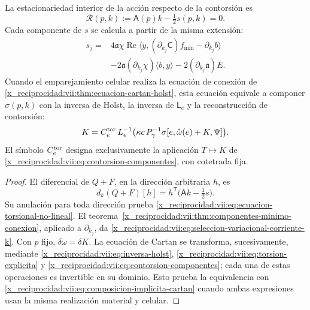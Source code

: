 \begin{proposition}
\label{x_reciprocidad:vii:prop:ecuacion-torsional-no-lineal}
La estacionariedad interior de la acción respecto de la contorsión es
\begin{equation}
 \mathcal R(p,k):=\mathsf A(p)k-\tfrac12s(p,k)=0.
 \label{x_reciprocidad:vii:eq:ecuacion-torsional-no-lineal}
\end{equation}
Cada componente de \(s\) se calcula a partir de la misma extensión:
\begin{equation}
 \begin{split}
 s_j={}&4\mathfrak a\chi\operatorname{Re}
       \langle y,(\partial_{k_j}\mathsf C)f_{\min}
                         -\partial_{k_j}b\rangle\\
 &-2\mathfrak a(\partial_{k_j}\chi)\langle b,y\rangle
       -2(\partial_{k_j}\mathfrak a)E.
 \end{split}
 \label{x_reciprocidad:vii:eq:seleccion-variacional-corriente-k}
\end{equation}
Cuando el emparejamiento celular realiza la ecuación de conexión de
\ref{x_reciprocidad:vii:thm:ecuacion-cartan-holst}, esta ecuación equivale a componer
\(\sigma(p,k)\) con la inversa de Holst, la inversa de
\(\mathsf L_e\) y la reconstrucción de contorsión:
\begin{equation}
 K=\mathsf C_e^{\rm tor}\,\mathsf L_e^{-1}
           \bigl(\kappa c\,\mathsf P_\gamma^{-1}
             \sigma[e,\mathring\omega(e)+K,\Psi]\bigr).
 \label{x_reciprocidad:vii:eq:composicion-implicita-cartan}
\end{equation}
El símbolo \(\mathsf C_e^{\rm tor}\) designa exclusivamente la
aplicación \(T\mapsto K\) de
\eqref{x_reciprocidad:vii:eq:contorsion-componentes}, con cotetrada fija.
\end{proposition}

\begin{proof}
El diferencial de \(Q+F\), en la dirección arbitraria \(h\), es
\[
 d_k(Q+F)[h]
   =h^{\mathsf T}\bigl(\mathsf A k-\tfrac12s\bigr).
\]
Su anulación para toda dirección prueba
\eqref{x_reciprocidad:vii:eq:ecuacion-torsional-no-lineal}.
El teorema~\ref{x_reciprocidad:vii:thm:componentes-minimo-conexion}, aplicado a
\(\partial_{k_j}\), da
\eqref{x_reciprocidad:vii:eq:seleccion-variacional-corriente-k}. Con \(p\) fijo,
\(\delta\omega=\delta K\). La ecuación de Cartan se transforma,
sucesivamente, mediante \eqref{x_reciprocidad:vii:eq:inversa-holst},
\eqref{x_reciprocidad:vii:eq:torsion-explicita} y
\eqref{x_reciprocidad:vii:eq:contorsion-componentes}; cada una de estas operaciones
es invertible en su dominio. Esto prueba la equivalencia con
\eqref{x_reciprocidad:vii:eq:composicion-implicita-cartan} cuando ambas expresiones
usan la misma realización material y celular.
\end{proof}

